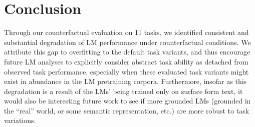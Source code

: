\section{Conclusion}
Through our counterfactual evaluation on 11 tasks, we identified consistent and substantial degradation of LM performance under counterfactual conditions. We attribute this gap to overfitting to the default task variants, and thus encourage future LM analyses to explicitly consider abstract task ability as detached from observed task performance, especially when these evaluated task variants might exist in abundance in the LM pretraining corpora.
Furthermore, insofar as this degradation is a result of the LMs' being trained only on surface form text, it would also be interesting future work to see if more grounded LMs (grounded in the ``real'' world, or some semantic representation, etc.) are more robust to task variations.
